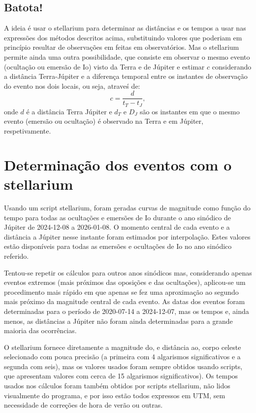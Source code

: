 \documentclass[]{article}
\begin{document}
\subsection{Batota!}
A ideia é usar o stellarium para determinar as distâncias e os tempos a usar nas
expressões dos métodos descritos acima, substituindo valores que poderiam em
princípio resultar de observações em feitas em observatórios. Mas o stellarium
permite ainda uma outra possibilidade, que consiste em observar o mesmo evento
(ocultação ou emersão de Io) visto da Terra e de Júpiter e estimar $c$
considerando a distância Terra-Júpiter e a diferença temporal entre os instantes
de observação do evento nos dois locais, ou seja, atraveś de:
\begin{equation}
  c=\frac{d}{t_T-t_J},
\end{equation}
onde $d$ é a distância Terra Júpiter e $d_T$ e $D_J$ são os instantes em que o
mesmo evento (emersão ou ocultação) é observado na Terra e em Júpiter,
respetivamente.

\section{Determinação dos eventos com o stellarium}
Usando um script stellarium, foram geradas curvas de magnitude como função do
tempo para todas as ocultações e emersões de Io durante o ano sinódico de
Júpiter de 2024-12-08 a 2026-01-08. O momento central de cada evento e a
distância a Júpiter nesse instante foram estimados por interpolação. Estes
valores estão disponíveis para todas as emersões e ocultações de Io no ano
sinódico referido.

Tentou-se repetir os cálculos para outros anos sinódicos mas, considerando
apenas eventos extremos (mais próximos das oposições e das ocultações),
aplicou-se um procedimento mais rápido em que apenas se fez uma
aproximação ao segundo mais próximo da magnitude central de cada evento. As
datas dos eventos foram determinadas para o período de 2020-07-14 a 2024-12-07,
mas os tempos e, ainda menos, as distâncias a Júpiter não foram ainda
determinadas para a grande maioria das ocorrências.

O stellarium fornece diretamente a magnitude do, e distância ao, corpo celeste
selecionado com pouca precisão (a primeira com 4 algarismos significativos e
a segunda com seis), mas os valores usados foram sempre obtidos usando
scripts, que apresentam valores com cerca de 15 algarismos significativos). Os
tempos usados nos cálculos foram também obtidos por scripts stellarium, não
lidos visualmente do programa, e por isso estão todos expressos em UTM, sem
necessidade de correções de hora de verão ou outras.
\end{document}
